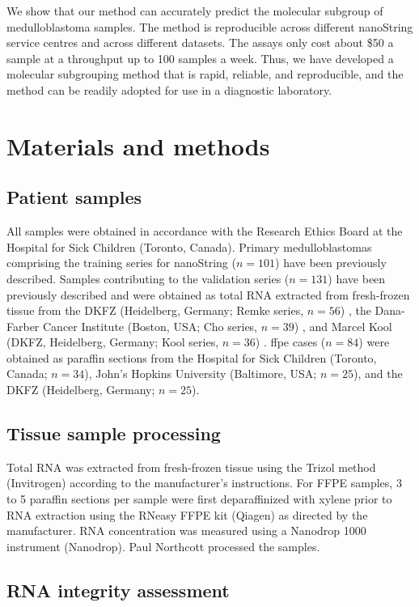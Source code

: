 We show that our method can accurately predict the molecular subgroup of medulloblastoma samples. The method is reproducible across different nanoString service centres and across different datasets. The assays only cost about \$50 a sample at a throughput up to 100 samples a week. Thus, we have developed a molecular subgrouping method that is rapid, reliable, and reproducible, and the method can be readily adopted for use in a diagnostic laboratory.


\section{Materials and methods}

\subsection{Patient samples}

All samples were obtained in accordance with the Research Ethics Board at the Hospital for Sick Children (Toronto, Canada).  Primary medulloblastomas comprising the training series for nanoString ($n = 101$) have been previously described.  Samples contributing to the validation series ($n = 131$) have been previously described and were obtained as total RNA extracted from fresh-frozen tissue from the DKFZ (Heidelberg, Germany; Remke series, $n = 56$) , the Dana-Farber Cancer Institute (Boston, USA; Cho series, $n = 39$) , and Marcel Kool (DKFZ, Heidelberg, Germany; Kool series, $n = 36$) .  \gls{ffpe} cases ($n = 84$) were obtained as paraffin sections from the Hospital for Sick Children (Toronto, Canada; $n = 34$), John’s Hopkins University (Baltimore, USA; $n = 25$), and the DKFZ (Heidelberg, Germany; $n = 25$).

\subsection{Tissue sample processing}

Total RNA was extracted from fresh-frozen tissue using the Trizol method (Invitrogen) according to the manufacturer’s instructions.  For FFPE samples, 3 to 5 paraffin sections per sample were first deparaffinized with xylene prior to RNA extraction using the RNeasy FFPE kit (Qiagen) as directed by the manufacturer.  RNA concentration was measured using a Nanodrop 1000 instrument (Nanodrop). Paul Northcott processed the samples.

\subsection{RNA integrity assessment}

